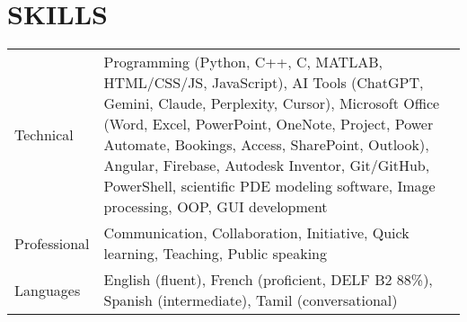 \documentclass[a4paper,10pt]{article}
\begin{document}
\section{SKILLS}
\begin{tabularx}{\linewidth}{@{}l X@{}}
Technical &  \normalsize{Programming (Python, C++, C, MATLAB, HTML/CSS/JS, JavaScript), AI Tools (ChatGPT, Gemini, Claude, Perplexity, Cursor), Microsoft Office (Word, Excel, PowerPoint, OneNote, Project, Power Automate, Bookings, Access, SharePoint, Outlook), Angular, Firebase, Autodesk Inventor, Git/GitHub, PowerShell, scientific PDE modeling software, Image processing, OOP, GUI development}\\
Professional  &  \normalsize{Communication, Collaboration, Initiative, Quick learning, Teaching, Public speaking}\\  
Languages & \normalsize{English (fluent), French (proficient, DELF B2 88\%), Spanish (intermediate), Tamil (conversational)}\\
\end{tabularx}

\end{document}
